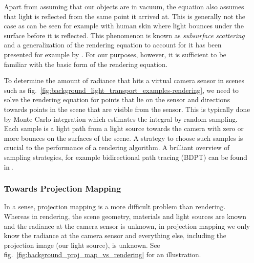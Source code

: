 Apart from assuming that our objects are in vacuum, the equation also assumes that light is reflected from the same point it arrived at. This is generally not the case as can be seen for example with human skin where light bounces under the surface before it is reflected. This phenomenon is known as \textit{subsurface scattering} and a generalization of the rendering equation to account for it has been presented for example by \citet{Jensen2001}. For our purposes, however, it is sufficient to be familiar with the basic form of the rendering equation.

To determine the amount of radiance that hits a virtual camera sensor in scenes such as fig.~\ref{fig:background_light_transport_examples-rendering}, we need to solve the rendering equation for points that lie on the sensor and directions towards points in the scene that are visible from the sensor. This is typically done by Monte Carlo integration which estimates the integral by random sampling. Each sample is a light path from a light source towards the camera with zero or more bounces on the surfaces of the scene. A strategy to choose such samples is crucial to the performance of a rendering algorithm. A brilliant overview of sampling strategies, for example bidirectional path tracing (BDPT) can be found in \citet{Veach1997}.

\subsubsection{Towards Projection Mapping}
\label{section:background-projection_mapping-light_transport-towards_projection_mapping}

In a sense, projection mapping is a more difficult problem than rendering. Whereas in rendering, the scene geometry, materials and light sources are known and the radiance at the camera sensor is unknown, in projection mapping we only know the radiance at the camera sensor and everything else, including the projection image (our light source), is unknown. See fig.~\ref{fig:background_proj_map_vs_rendering} for an illustration.

